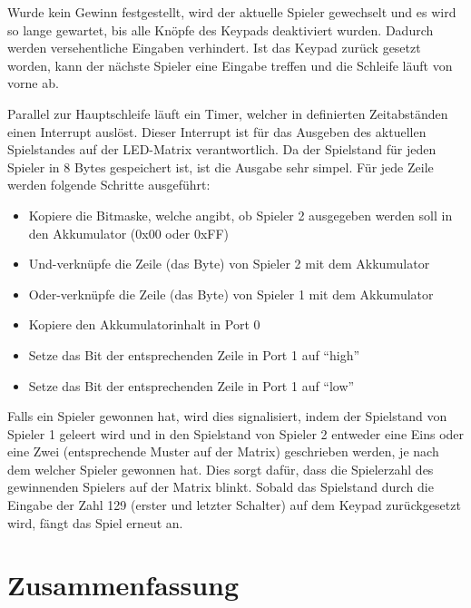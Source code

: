 Wurde kein Gewinn festgestellt, wird der aktuelle Spieler gewechselt und es wird so lange gewartet, bis alle Knöpfe des Keypads deaktiviert wurden. Dadurch werden versehentliche Eingaben verhindert. 
Ist das Keypad zurück gesetzt worden, kann der nächste Spieler eine Eingabe treffen und die Schleife läuft von vorne ab.

Parallel zur Hauptschleife läuft ein Timer, welcher in definierten Zeitabständen einen Interrupt auslöst.
Dieser Interrupt ist für das Ausgeben des aktuellen Spielstandes auf der LED-Matrix verantwortlich. 
Da der Spielstand für jeden Spieler in 8 Bytes gespeichert ist, ist die Ausgabe sehr simpel. Für jede Zeile werden folgende Schritte ausgeführt:
\begin{itemize}
	\item Kopiere die Bitmaske, welche angibt, ob Spieler 2 ausgegeben werden soll in den Akkumulator (0x00 oder 0xFF)
	\item Und-verknüpfe die Zeile (das Byte) von Spieler 2 mit dem Akkumulator
	\item Oder-verknüpfe die Zeile (das Byte) von Spieler 1 mit dem Akkumulator
	\item Kopiere den Akkumulatorinhalt in Port 0
	\item Setze das Bit der entsprechenden Zeile in Port 1 auf \enquote{high}
	\item Setze das Bit der entsprechenden Zeile in Port 1 auf \enquote{low}
\end{itemize}

Falls ein Spieler gewonnen hat, wird dies signalisiert, indem der Spielstand von Spieler 1 geleert wird und in den Spielstand von Spieler 2 entweder eine Eins oder eine Zwei (entsprechende Muster auf der Matrix) geschrieben werden, je nach dem welcher Spieler gewonnen hat.
Dies sorgt dafür, dass die Spielerzahl des gewinnenden Spielers auf der Matrix blinkt.
Sobald das Spielstand durch die Eingabe der Zahl 129 (erster und letzter Schalter) auf dem Keypad zurückgesetzt wird, fängt das Spiel erneut an.


\FloatBarrier
\chapter{Zusammenfassung}

